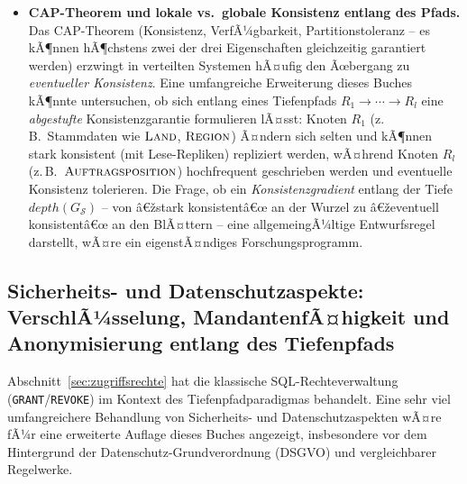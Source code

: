 ﻿\documentclass[a4paper,12pt]{report}
\theoremstyle{definition}
\theoremstyle{remark}
\newcommand{\depth}{\mathit{depth}}
\begin{document}
\begin{itemize}
  \item \textbf{CAP-Theorem und lokale vs.\ globale Konsistenz
    entlang des Pfads.} Das CAP-Theorem (Konsistenz,
    VerfÃ¼gbarkeit, Partitionstoleranz -- es kÃ¶nnen hÃ¶chstens zwei der
    drei Eigenschaften gleichzeitig garantiert werden) erzwingt in
    verteilten Systemen hÃ¤ufig den Ãœbergang zu
    \emph{eventueller Konsistenz}. Eine umfangreiche Erweiterung
    dieses Buches kÃ¶nnte untersuchen, ob sich entlang eines
    Tiefenpfads $R_1\to\cdots\to R_l$ eine \emph{abgestufte}
    Konsistenzgarantie formulieren lÃ¤sst: Knoten $R_1$ (z.\,B.\
    Stammdaten wie $\textsc{Land}$, $\textsc{Region}$) Ã¤ndern sich
    selten und kÃ¶nnen stark konsistent (mit Lese-Repliken)
    repliziert werden, wÃ¤hrend Knoten $R_l$ (z.\,B.\
    $\textsc{Auftragsposition}$) hochfrequent geschrieben werden und
    eventuelle Konsistenz tolerieren. Die Frage, ob ein
    \emph{Konsistenzgradient} entlang der Tiefe $\depth(G_{\mathcal{S}})$
    -- von â€žstark konsistentâ€œ an der Wurzel zu â€ževentuell konsistentâ€œ
    an den BlÃ¤ttern -- eine allgemeingÃ¼ltige Entwurfsregel darstellt,
    wÃ¤re ein eigenstÃ¤ndiges Forschungsprogramm.
\end{itemize}

\subsection{Sicherheits- und Datenschutzaspekte: VerschlÃ¼sselung, MandantenfÃ¤higkeit und Anonymisierung entlang des Tiefenpfads}
\label{sec:ausblick-sicherheit}

Abschnitt~\ref{sec:zugriffsrechte} hat die klassische
SQL-Rechteverwaltung (\texttt{GRANT}/\texttt{REVOKE}) im Kontext des
Tiefenpfadparadigmas behandelt. Eine sehr viel umfangreichere
Behandlung von Sicherheits- und Datenschutzaspekten wÃ¤re fÃ¼r eine
erweiterte Auflage dieses Buches angezeigt, insbesondere vor dem
Hintergrund der Datenschutz-Grundverordnung (DSGVO) und vergleichbarer
Regelwerke.
\end{document}
